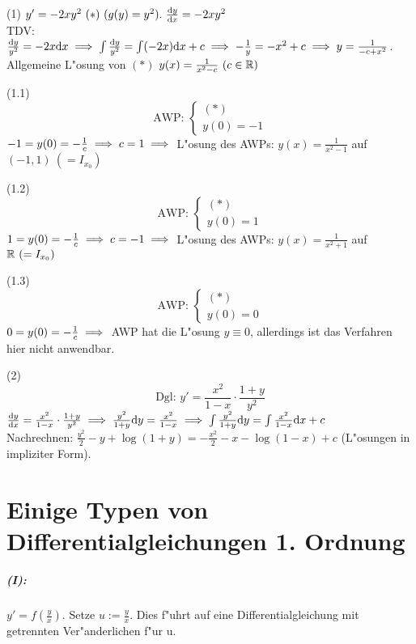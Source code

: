 \documentclass[a4paper,twoside,DIV15,BCOR12mm]{scrbook}
\begin{document}
\begin{beispiele}
\item[(1)] $y'=-2xy^2\ (*)\ (g(y)=y^2).\ \frac{\ud y}{\ud x}=-2xy^2$\\
TDV: $\frac{\mathrm{d} y}{y^2}=-2x\mathrm{d} x\implies\int\frac{\mathrm{d} y}{y^2}=\int(-2x)\mathrm{d} x+c\implies -\frac{1}{y}=-x^2+c\implies y=\frac{1}{-c+x^2}$. Allgemeine L"osung von $(*)$ $y(x)=\frac{1}{x^2-c}\ (c\in\mathbb{R})$
\item[(1.1)] $$\text{AWP: }\begin{cases} (*) \\ y(0)=-1\end{cases}$$
	$-1=y(0)=-\frac{1}{c}\implies c=1\implies$ L"osung des AWPs: $y(x)=\frac{1}{x^2-1}$ auf $(-1,1)\ (=I_{x_0})$
\item[(1.2)] $$\text{AWP: }\begin{cases} (*) \\ y(0)=1\end{cases}$$
	$1=y(0)=-\frac{1}{c}\implies c=-1\implies$ L"osung des AWPs: $y(x)=\frac{1}{x^2+1}$ auf $\mathbb{R}\ (=I_{x_0})$
\item[(1.3)] $$\text{AWP: }\begin{cases} (*) \\ y(0)=0\end{cases}$$
	$0=y(0)=-\frac{1}{c}\implies$ AWP hat die L"osung $y\equiv 0$, allerdings ist das Verfahren hier nicht anwendbar.
\item[(2)]$$\text{Dgl: }y'=\frac{x^2}{1-x}\cdot\frac{1+y}{y^2}$$ $\frac{\mathrm{d} y}{\mathrm{d} x}=\frac{x^2}{1-x}\cdot\frac{1+y}{y^2}\implies
	\frac{y^2}{1+y}\mathrm{d} y=\frac{x^2}{1-x}\implies\int\frac{y^2}{1+y}\mathrm{d} y=\int\frac{x^2}{1-x}\mathrm{d} x+c$\\
	Nachrechnen: $\frac{y^2}{2}-y+\log(1+y)=-\frac{x^2}{2}-x-\log(1-x)+c$ (L"osungen in impliziter Form).
\end{beispiele}

\chapter{Einige Typen von Differentialgleichungen 1. Ordnung}

\paragraph{(I): }$y'=f(\frac{y}{x})$. Setze $u:=\frac{y}{x}$. Dies f"uhrt auf eine Differentialgleichung mit getrennten Ver"anderlichen f"ur u.
\end{document}

